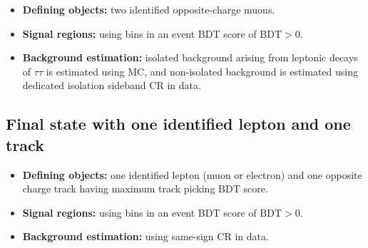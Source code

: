 \begin{itemize}
\item \textbf{Defining objects:} two identified opposite-charge muons.
\item \textbf{Signal regions:} using bins in an event BDT score of $\text{BDT}>0$.
\item \textbf{Background estimation:} isolated background arising from leptonic decays of $\tau\tau$ is estimated using MC, and non-isolated background is estimated using dedicated isolation sideband CR in data.

\end{itemize}

\subsection{Final state with one identified lepton and one track}
\label{sec:exclusive-track-category}

\begin{itemize}
\item \textbf{Defining objects:} one identified lepton (muon or electron) and one opposite charge track having maximum track picking BDT score.
\item \textbf{Signal regions:} using bins in an event BDT score of $\text{BDT}>0$.
\item \textbf{Background estimation:} using same-sign CR in data.
\end{itemize}